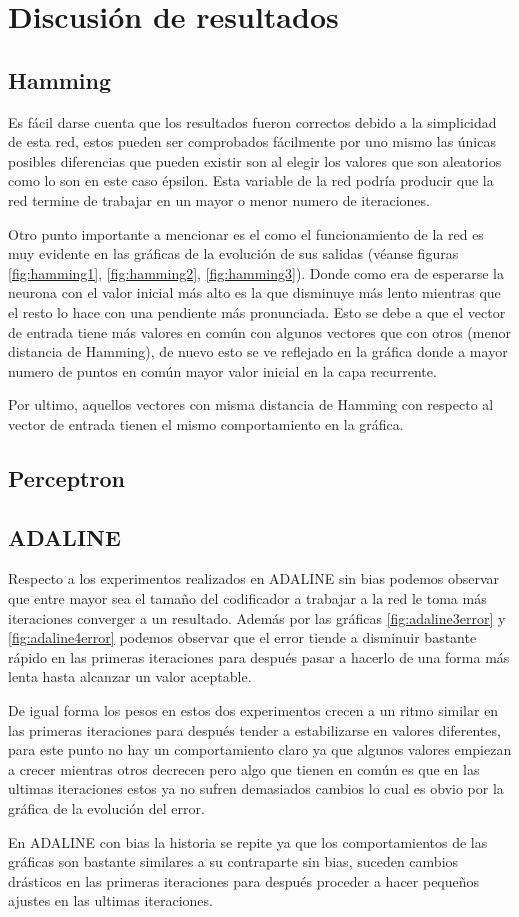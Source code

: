 \section{Discusión de resultados}
\subsection{Hamming}
Es fácil darse cuenta que los resultados fueron correctos debido a la simplicidad de esta red, estos pueden ser comprobados fácilmente por uno mismo las únicas posibles diferencias que pueden existir son al elegir los valores que son aleatorios como lo son en este caso épsilon. Esta variable de la red podría producir que la red termine de trabajar en un mayor o menor numero de iteraciones.

Otro punto importante a mencionar es el como el funcionamiento de la red es muy evidente en las gráficas de la evolución de sus salidas (véanse figuras \ref{fig:hamming1}, \ref{fig:hamming2}, \ref{fig:hamming3}). Donde como era de esperarse la neurona con el valor inicial más alto es la que disminuye más lento mientras que el resto lo hace con una pendiente más pronunciada. Esto se debe a que el vector de entrada tiene más valores en común con algunos vectores que con otros (menor distancia de Hamming), de nuevo esto se ve reflejado en la gráfica donde a mayor numero de puntos en común mayor valor inicial en la capa recurrente.

Por ultimo, aquellos vectores con misma distancia de Hamming con respecto al vector de entrada tienen el mismo comportamiento en la gráfica.
\subsection{Perceptron}
\subsection{ADALINE}
Respecto a los experimentos realizados en ADALINE sin bias podemos observar que entre mayor sea el tamaño del codificador a trabajar a la red le toma más iteraciones converger a un resultado. Además por las gráficas \ref{fig:adaline3error} y \ref{fig:adaline4error} podemos observar que el error tiende a disminuir bastante rápido en las primeras iteraciones para después pasar a hacerlo de una forma más lenta hasta alcanzar un valor aceptable.

De igual forma los pesos en estos dos experimentos crecen a un ritmo similar en las primeras iteraciones para después tender a estabilizarse en valores diferentes, para este punto no hay un comportamiento claro ya que algunos valores empiezan a crecer mientras otros decrecen pero algo que tienen en común es que en las ultimas iteraciones estos ya no sufren demasiados cambios lo cual es obvio por la gráfica de la evolución del error.

En ADALINE con bias la historia se repite ya que los comportamientos de las gráficas son bastante similares a su contraparte sin bias, suceden cambios drásticos en las primeras iteraciones para después proceder a hacer pequeños ajustes en las ultimas iteraciones.